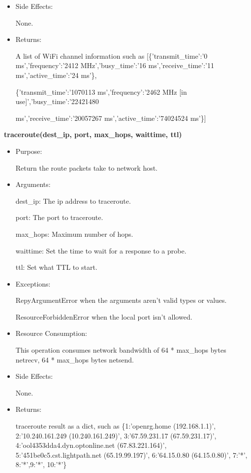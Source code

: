 {\begin{itemize}
FileNotFoundError is raised if iw tool does not exist.

\item Side Effects:

None.

\item Returns:

A list of WiFi channel information such as [\{'transmit\_time':'0 ms','frequency':'2412 MHz','busy\_time':'16 ms','receive\_time':'11 ms','active\_time':'24 ms'\},

\{'transmit\_time':'1070113 ms','frequency':'2462 MHz [in use]','busy\_time':'22421480 

ms','receive\_time':'20057267 ms','active\_time':'74024524 ms'\}]
\end{itemize}

\textbf{traceroute(dest\_ip, port, max\_hops, waittime, ttl)}
\begin{itemize}
\item Purpose:

Return the route packets take to network host.

\item Arguments:

dest\_ip: The ip address to traceroute.

port: The port to traceroute.

max\_hops: Maximum number of hops.

waittime: Set the time to wait for a response to a probe.

ttl: Set what TTL to start.

\item Exceptions:

RepyArgumentError when the arguments aren't valid types or values.


ResourceForbiddenError when the local port isn't allowed.

\item Resource Consumption:

This operation consumes network bandwidth of 64 * max\_hops bytes netrecv, 64 * max\_hops bytes netsend.

\item Side Effects:

None.

\item Returns:

traceroute result as a dict, such as \{1:'openrg.home (192.168.1.1)', 2:'10.240.161.249 (10.240.161.249)', 3:'67.59.231.17 (67.59.231.17)', 4:'ool4353dda4.dyn.optonline.net (67.83.221.164)', 5:'451be0c5.cst.lightpath.net (65.19.99.197)', 6:'64.15.0.80 (64.15.0.80)', 7:'*', 8:'*',9:'*', 10:'*'\}
\end{itemize}

}
